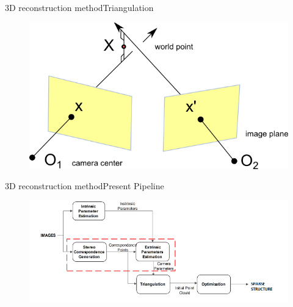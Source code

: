 \documentclass{beamer}
\begin{document}
\begin{frame}{3D reconstruction method}{Triangulation}
  \begin{figure}[ht!]
    \centering
    \includegraphics[width=0.6\linewidth]{triangulation.png}
  \note{\textcolor{green}{Prateek\\}}

  \end{figure}
\end{frame}

\begin{frame}{3D reconstruction method}{Present Pipeline}
  \begin{figure}[ht!]
    \centering
    \includegraphics[width=\linewidth]{traditional_paipeline.png}
  \end{figure}
  \note{\textcolor{red}{Kartikeya\\}}
\end{frame}
\end{document}
